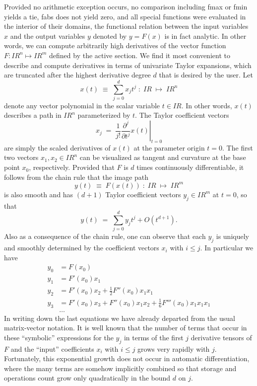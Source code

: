 \documentclass[11pt,twoside]{article}
\begin{document}
Provided no arithmetic exception occurs,
no comparison including {\sf fmax} or  {\sf fmin} yields a tie, 
{\sf fabs} does not yield zero,
and all special functions were evaluated in the
interior of their domains, the functional relation between the input
variables $x$
and the output variables $y$ denoted by $y=F(x)$ is in
fact analytic.  In other words, we can compute arbitrarily high
derivatives of the vector function $F : I\!\!R^n \mapsto I\!\!R^m$ defined
by the active section.
We find it most convenient to describe and
compute derivatives in terms of univariate Taylor expansions, which
are truncated after the highest derivative degree $d$ that is desired
by the user. Let
\begin{equation}
\label{eq:x_of_t}
x(t) \; \equiv \; \sum_{j=0}^dx_jt^j \; : \;  I\!\!R \; \mapsto \;
I\!\!R^n 
\end{equation} 
denote any vector polynomial in the scalar variable $t \in I\!\!R$.
In other words, $x(t)$ describes a path in $I\!\!R^n$ parameterized by $t$.
The Taylor coefficient vectors 
\[ x_j \; = \; 
\frac{1}{j!} \left .  \frac{\partial ^j}{\partial t^j} x(t)
\right |_{t=0}
\] 
are simply the scaled derivatives of $x(t)$ at the parameter 
origin $t=0$. The first two vectors $x_1,x_2 \in I\!\!R^n$ can be
visualized as tangent and curvature at the base point $x_0$,
respectively. 
Provided that $F$ is $d$ times continuously differentiable, it
follows from the chain rule that the image path
\begin{equation}
\label{eq:rela}
 y(t) \; \equiv \; F(x(t)) \; : \;  I\!\!R \;\mapsto \;I\!\!R^m 
\end{equation}
is also smooth and has $(d+1)$ Taylor coefficient vectors 
$y_j \in I\!\!R^m$ at $t=0$, so that 
\begin{equation}
\label{eq:series}
y(t) \; = \; \sum_{j=0}^d y_jt^j + O(t^{d+1}).
\end{equation}
Also as a consequence of the chain rule, one can observe that
each $y_j$ is uniquely and smoothly determined by the coefficient 
vectors $x_i$ with $i \leq j$.  In particular we have 
\begin{align}
\label{eq:y_0y_1}
  y_0 & = F(x_0) \nonumber \\
  y_1 & = F'(x_0) x_1 \nonumber\\
  y_2 & = F'(x_0) x_2 + \frac{1}{2}F''(x_0)x_1 x_1 \\
  y_3 & = F'(x_0) x_3 + F''(x_0)x_1 x_2
          + \frac{1}{6}F'''(x_0)x_1 x_1 x_1\nonumber\\
  & \ldots\nonumber
\end{align}
In writing down the last equations we have already departed from the
usual matrix-vector notation. It is well known that the number of
terms that occur in these ``symbolic'' expressions for
the $y_j$ in terms of the first $j$ derivative tensors of $F$ and
the ``input'' coefficients $x_i$ with $i\leq j$ grows very rapidly
with $j$. Fortunately, this exponential growth does not occur
in automatic differentiation, where the many terms are somehow
implicitly combined  so that storage and operations count grow only
quadratically in the bound $d$ on $j$.
\end{document}
